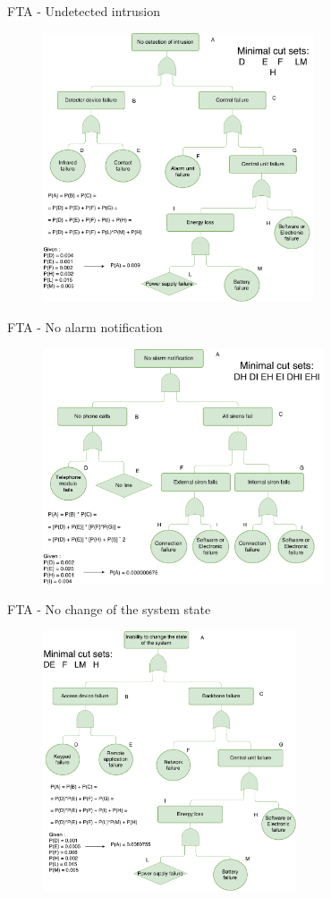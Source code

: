 \begin{frame}{FTA - Undetected intrusion}

    \begin{figure}[ht!]
      \label{fig:fta_undetected_intrusion}
      \includegraphics[width=80mm]{images/fta_undetected_intrusion.pdf}
    \end{figure}
\end{frame}

\begin{frame}{FTA - No alarm notification}
    \begin{figure}[ht!]
      \includegraphics[width=83mm]{images/fta_no_alarm_notification.pdf}
      \label{fig:fta_no_alarm_notification}
    \end{figure}
\end{frame}

\begin{frame}{FTA - No change of the system state}
    \begin{figure}[ht!]
      \includegraphics[width=75mm]{images/fta_no_change.pdf}
      \label{fig:fta_no_change}
    \end{figure}
\end{frame}
